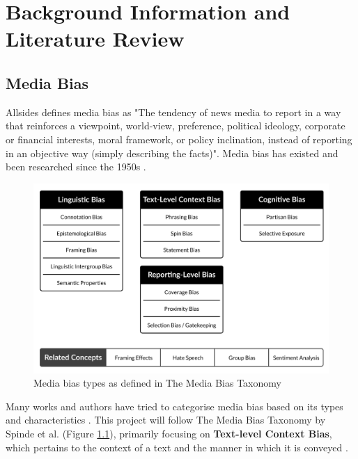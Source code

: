 \chapter{Background Information and Literature Review}
\label{cha:2}

\section{Media Bias}

Allsides \cite{allsides-2022-bias-definition} defines media bias as "The tendency of news media to report in a way that reinforces a viewpoint, world-view, preference, political ideology, corporate or financial interests, moral framework, or policy inclination, instead of reporting in an objective way (simply describing the facts)". Media bias has existed and been researched since the 1950s \cite{white-1950-case-study-selection-news}.

\begin{figure}[htbp]
    \centering
    \includegraphics[width=0.9\linewidth]{images/bias-types-taxonomy.png}
    \caption{Media bias types as defined in The Media Bias Taxonomy \cite{spinde-2024-taxonomy}}
    \label{fig:media-bias-taxonomy}
\end{figure}

Many works and authors have tried to categorise media bias based on its types and characteristics \cite{rodrigo-2024-systematic-review-media-bias,eberl-2017-bias-political,spinde-2024-taxonomy,allsides-media-bias-types}. This project will follow The Media Bias Taxonomy by Spinde et al. (Figure \ref{fig:media-bias-taxonomy}), primarily focusing on \textbf{Text-level Context Bias}, which pertains to the context of a text and the manner in which it is conveyed \cite{spinde-2024-taxonomy}.

